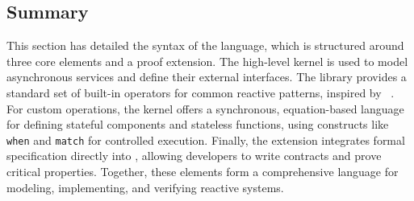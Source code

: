 \subsection{Summary}
This section has detailed the syntax of the \GRust language, which is structured around three core
elements and a proof extension. The high-level \GRFRP kernel is used to model asynchronous services
and define their external interfaces. The \GReact library provides a standard set of built-in
operators for common reactive patterns, inspired by \ReactiveX~\cite{reactivex}. For custom
operations, the \GRSync kernel offers a synchronous, equation-based language for defining stateful
components and stateless functions, using constructs like \texttt{when} and \texttt{match} for
controlled execution. Finally, the \GReusot extension integrates formal specification directly into
\GRSync, allowing developers to write contracts and prove critical properties. Together, these
elements form a comprehensive language for modeling, implementing, and verifying reactive systems.
